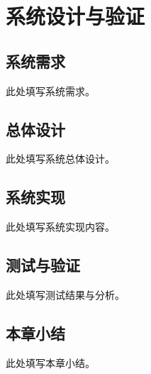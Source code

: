 \chapter{系统设计与验证}
\label{chap:system}
\section{系统需求}
此处填写系统需求。
\section{总体设计}
此处填写系统总体设计。
\section{系统实现}
此处填写系统实现内容。
\section{测试与验证}
此处填写测试结果与分析。
\section{本章小结}
此处填写本章小结。
